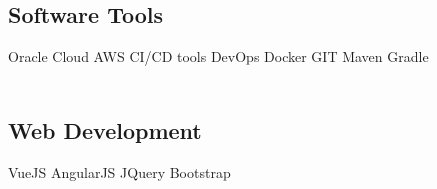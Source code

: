 \documentclass[]{resume-openfont}
\begin{document}
\begin{minipage}[t]{0.33\textwidth}
\subsection{Software Tools}
Oracle Cloud \textbullet{} AWS \textbullet{} CI/CD tools \textbullet{} DevOps \textbullet{} Docker \textbullet{} GIT \textbullet{} Maven \textbullet{} Gradle \\~\\
\subsection{Web Development}
VueJS \textbullet{}  AngularJS \textbullet{} JQuery \textbullet{} Bootstrap \\~\\

%
%

\end{minipage}
\hfill
\end{document}

